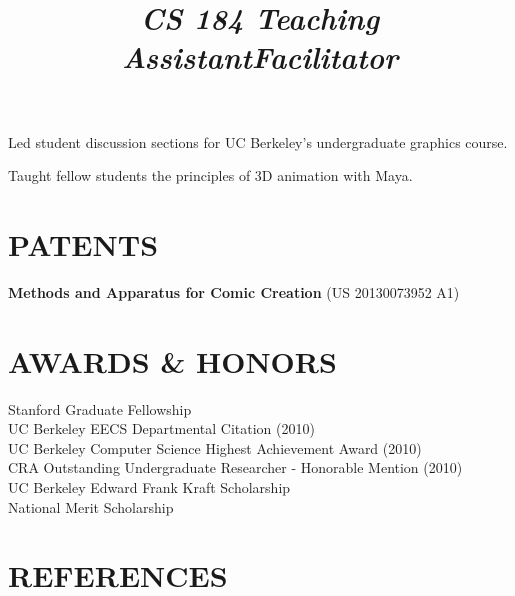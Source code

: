 \documentclass[line,margin]{res}
\begin{document}
\begin{resume}
\title{{\sl CS 184 Teaching Assistant}}
\begin{position}
Led student discussion sections for UC Berkeley's undergraduate graphics course.
\end{position}

\title{{\sl Facilitator}}
\begin{position}
Taught fellow students the principles of 3D animation with Maya.
\end{position}


\section{PATENTS}

\textbf{Methods and Apparatus for Comic Creation} (US 20130073952 A1)

\section{AWARDS \& HONORS}
Stanford Graduate Fellowship \\ 
UC Berkeley EECS Departmental Citation (2010) \\
UC Berkeley Computer Science Highest Achievement Award (2010) \\
CRA Outstanding Undergraduate Researcher - Honorable Mention (2010) \\
UC Berkeley Edward Frank Kraft Scholarship \\
National Merit Scholarship 


\section{REFERENCES}

\end{resume}
\end{document}
